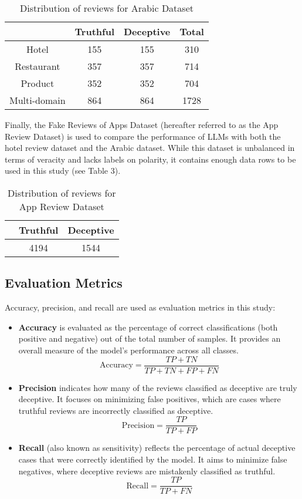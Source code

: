 \documentclass[sigconf, nonacm]{acmart}
\theoremstyle{definition}
\begin{document}
\begin{table}[h!]
  \centering
  \caption{Distribution of reviews for Arabic Dataset}
  \begin{tabular}{c c c c}
    \toprule
                 & Truthful & Deceptive & Total \\
    \midrule
    Hotel        & 155      & 155       & 310   \\
    Restaurant   & 357      & 357       & 714   \\
    Product      & 352      & 352       & 704   \\
    Multi-domain & 864      & 864       & 1728  \\
    \bottomrule
  \end{tabular}
\end{table}

Finally, the Fake Reviews of Apps Dataset (hereafter referred to as the App Review Dataset) is used to compare the performance of LLMs with both the hotel review dataset and the Arabic dataset. While this dataset is unbalanced in terms of veracity and lacks labels on polarity, it contains enough data rows to be used in this study (see Table 3).

\begin{table}[h!]
  \centering
  \caption{Distribution of reviews for App Review Dataset}
  \begin{tabular}{c c c}
    \toprule
     & Truthful & Deceptive \\
    \midrule
     & 4194     & 1544      \\
    \bottomrule
  \end{tabular}
\end{table}

\subsection{Evaluation Metrics}
Accuracy, precision, and recall are used as evaluation metrics in this study:

\begin{itemize}
  \item \textbf{Accuracy} is evaluated as the percentage of correct classifications (both positive and negative) out of the total number of samples. It provides an overall measure of the model's performance across all classes.
        \[
          \text{Accuracy} = \frac{TP + TN}{TP + TN + FP + FN}
        \]
  \item \textbf{Precision} indicates how many of the reviews classified as deceptive are truly deceptive. It focuses on minimizing false positives, which are cases where truthful reviews are incorrectly classified as deceptive.
        \[
          \text{Precision} = \frac{TP}{TP + FP}
        \]
  \item \textbf{Recall} (also known as sensitivity) reflects the percentage of actual deceptive cases that were correctly identified by the model. It aims to minimize false negatives, where deceptive reviews are mistakenly classified as truthful.
        \[
          \text{Recall} = \frac{TP}{TP + FN}
        \]
\end{itemize}
\end{document}
